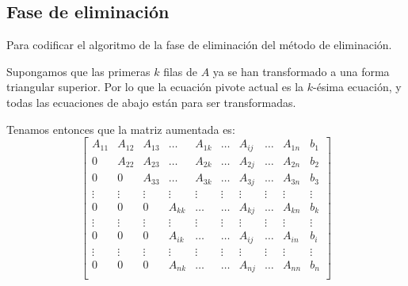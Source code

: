 \subsection*{Fase de eliminación}
Para codificar el algoritmo de la fase de eliminación del método de eliminación.
\par
Supongamos que las primeras $k$ filas de $A$ ya se han transformado a una forma triangular superior. Por lo que la ecuación pivote actual es la $k$-ésima ecuación, y todas las ecuaciones de abajo están para ser transformadas.
\par
Tenamos entonces que la matriz aumentada es:
\[ \begin{bmatrix}
A_{11} & A_{12} & A_{13} & \ldots & A_{1k} & \ldots & A_{ij} & \ldots & A_{1n} & b_{1} \\
0      & A_{22} & A_{23} & \ldots & A_{2k} & \ldots & A_{2j} & \ldots & A_{2n} & b_{2} \\
0      & 0      & A_{33} & \ldots & A_{3k} & \ldots & A_{3j} & \ldots & A_{3n} & b_{3} \\
\vdots & \vdots & \vdots & \vdots & \vdots & \vdots & \vdots & \vdots & \vdots & \vdots \\
0      & 0      & 0      & A_{kk} & \ldots & \ldots & A_{kj} & \ldots & A_{kn} & b_{k} \\
\vdots & \vdots & \vdots & \vdots & \vdots & \vdots & \vdots & \vdots & \vdots & \vdots \\
0      & 0      & 0      & A_{ik} & \ldots & \ldots & A_{ij} & \ldots & A_{in} & b_{i} \\
\vdots & \vdots & \vdots & \vdots & \vdots & \vdots & \vdots & \vdots & \vdots & \vdots \\
0      & 0      & 0      & A_{nk} & \ldots & \ldots & A_{nj} & \ldots & A_{nn} & b_{n} \\
\end{bmatrix}
\]
